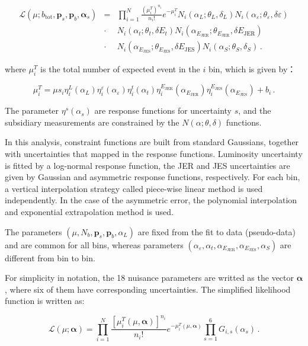 \begin{eqnarray}
\mathcal{L}(\mu;b_\mathrm{tot},\bm{p}_s,\bm{p}_b,\bm{\alpha}_s)
& = & \prod_{i=1}^N \frac{(\mu^T_i)^{n_i}}{n_i! } e^{-\mu^T_i}
N_i(\alpha_L;\theta_L,\delta_L)
N_i(\alpha_\varepsilon;\theta_\varepsilon,\delta\varepsilon)\nonumber\\
& \cdot &
N_i(\alpha_t;\theta_t,\delta E_t)
N_i(\alpha_{E_\mathrm{JER}};\theta_{E_\mathrm{JER}},\delta E_\mathrm{JER})\\
& \cdot &
N_i(\alpha_{E_\mathrm{JES}};\theta_{E_\mathrm{JES}},\delta E_\mathrm{JES})
N_i(\alpha_S;\theta_S,\delta_S)\, .
\end{eqnarray}

\noindent
where $\mu^T_i$ is the total number of expected event in the $i$ bin, which is
given by：

\begin{equation}
\mu^T_i = \mu s_i 
\eta^L_i(\alpha_L) 
\eta^\varepsilon_i(\alpha_\varepsilon) 
\eta^t_i(\alpha_t)
\eta^{E_\mathrm{JER}}_i (\alpha_{E_\mathrm{JER}})
\eta^{E_\mathrm{JES}}_i (\alpha_{E_\mathrm{JES}}) + b_i \, .
\end{equation}

\noindent
The parameter $\eta^s(\alpha_s)$ are response functions for uncertainty $s$, and
the subsidiary measurements are constrained by the
$N(\alpha;\theta,\delta)$ functions. 

In this analysis, constraint functions are built from standard Gaussians, together with uncertainties that mapped in the response functions. Luminosity uncertainty is fitted by a log-normal response function, the JER and JES uncertainties are given by Gaussian and asymmetric response functions, respectively. For each bin, a vertical interpolation strategy called piece-wise linear method is used independently. In the case of the asymmetric error, the polynomial interpolation and exponential extrapolation method is used.

The parameters $(\mu,N_b,\bm{p}_s,\bm{p}_b,\alpha_L)$ are fixed from the fit to data (pseudo-data) and are common for all bins, whereas parameters
$(\alpha_\varepsilon,\alpha_t,\alpha_{E_\mathrm{JER}},\alpha_{E_\mathrm{JES}},\alpha_S)$ 
are different from bin to bin.

For simplicity in notation, the 18 nuisance parameters are writted as the
vector $\bm{\alpha}$, where six of them have corresponding uncertainties.
The simplified likelihood function is written as:

\begin{equation}
\mathcal{L}(\mu;\bm{\alpha}) = \prod_{i=1}^N
\frac{[\mu^T_i(\mu,\bm{\alpha})]^{n_i}}{n_i!} e^{-\mu^T_i(\mu,\bm{\alpha})}
\prod_{s=1}^6 G_{i,s}(\alpha_s)\, .
\end{equation}

